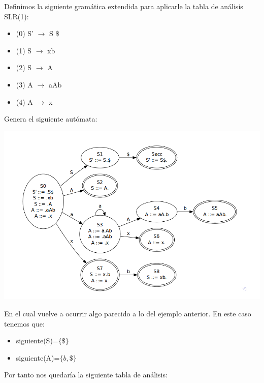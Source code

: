 \documentclass{apuntes}
\begin{document}
\begin{example}
Definimos la siguiente gramática extendida para aplicarle la tabla de análisis SLR(1):

\begin{itemize}
\item (0) S' $\rightarrow$ S \$
\item (1) S $\rightarrow$ xb
\item (2) S $\rightarrow$ A
\item (3) A $\rightarrow$ aAb
\item (4) A $\rightarrow$ x
\end{itemize}

Genera el siguiente autómata:
\begin{center}
\includegraphics[scale=0.5]{img/automataslr1c1.jpg}
\end{center}

En el cual vuelve a ocurrir algo parecido a lo del ejemplo anterior. En este caso tenemos que:
\begin{itemize}
\item siguiente(S)=$\{\$\}$
\item siguiente(A)=$\{b,\$\}$
\end{itemize}
Por tanto nos quedaría la siguiente tabla de análisis:


\end{example}
\end{document}
